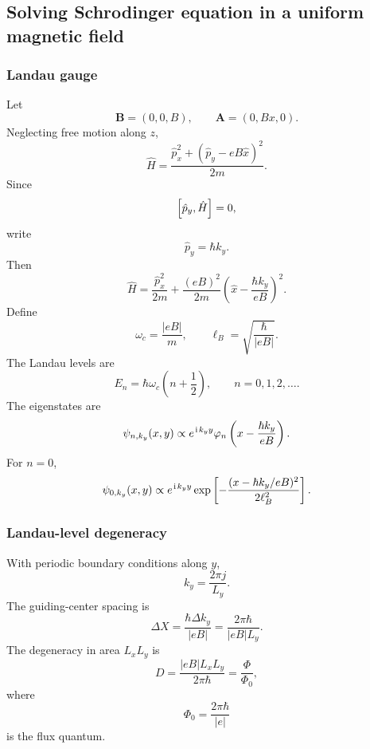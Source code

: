 \subsection{Solving Schrodinger equation in a uniform magnetic field}

\subsubsection{Landau gauge}
Let
\begin{equation}
\bm B=(0,0,B),
\qquad
\bm A=(0,Bx,0).
\end{equation}
Neglecting free motion along $z$,
\begin{equation}
\hat H=\frac{\hat p_x^2+(\hat p_y-eB\hat x)^2}{2m}.
\end{equation}
Since
\begin{equation}
\left[\hat p_y,\hat H\right]=0,
\end{equation}
write
\begin{equation}
\hat p_y=\hbar k_y.
\end{equation}
Then
\begin{equation}
\hat H=\frac{\hat p_x^2}{2m}
+\frac{(eB)^2}{2m}
\left(\hat x-\frac{\hbar k_y}{eB}\right)^2.
\end{equation}
Define
\begin{equation}
\omega_c=\frac{|eB|}{m},
\qquad
\ell_B=\sqrt{\frac{\hbar}{|eB|}}.
\end{equation}
The Landau levels are
\begin{equation}
\boxed{E_n=\hbar\omega_c\left(n+\frac12\right),
\qquad n=0,1,2,\ldots.}
\end{equation}
The eigenstates are
\begin{equation}
\psi_{n,k_y}(x,y)
\propto e^{\hspace{1pt}\mathrm{i}\hspace{1pt} k_yy}
\varphi_n\left(x-\frac{\hbar k_y}{eB}\right).
\end{equation}
For $n=0$,
\begin{equation}
\psi_{0,k_y}(x,y)
\propto e^{\hspace{1pt}\mathrm{i}\hspace{1pt} k_yy}
\exp\left[-\frac{(x-\hbar k_y/eB)^2}{2\ell_B^2}\right].
\end{equation}

\subsubsection{Landau-level degeneracy}
With periodic boundary conditions along $y$,
\begin{equation}
k_y=\frac{2\pi j}{L_y}.
\end{equation}
The guiding-center spacing is
\begin{equation}
\Delta X=\frac{\hbar\Delta k_y}{|eB|}
=\frac{2\pi\hbar}{|eB|L_y}.
\end{equation}
The degeneracy in area $L_xL_y$ is
\begin{equation}
\boxed{D=\frac{|eB|L_xL_y}{2\pi\hbar}
=\frac{\Phi}{\Phi_0},}
\end{equation}
where
\begin{equation}
\Phi_0=\frac{2\pi\hbar}{|e|}
\end{equation}
is the flux quantum.

